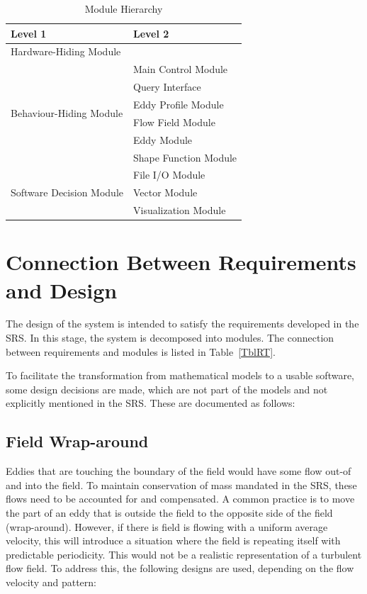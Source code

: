 \documentclass[12pt, titlepage]{article}
\begin{document}
\begin{table}[h!]
\centering
\begin{tabular}{p{} p{}}
\toprule
\textbf{Level 1} & \textbf{Level 2}\\
\midrule

{Hardware-Hiding Module} & ~ \\
\midrule

\multirow{6}{0.3\textwidth}{Behaviour-Hiding Module}
& Main Control Module\\
& Query Interface\\
& Eddy Profile Module\\
& Flow Field Module\\
& Eddy Module\\
& Shape Function Module\\
\midrule

\multirow{3}{0.3\textwidth}{Software Decision Module} 
& File I/O Module\\
& Vector Module\\
& Visualization Module\\
\bottomrule

\end{tabular}
\caption{Module Hierarchy}
\label{TblMH}
\end{table}

\section{Connection Between Requirements and Design} \label{SecConnection}

The design of the system is intended to satisfy the requirements developed in
the SRS. In this stage, the system is decomposed into modules. The connection
between requirements and modules is listed in Table~\ref{TblRT}.

To facilitate the transformation from mathematical models to a usable software, some design decisions are made, which are not part of the models and not explicitly mentioned in the SRS. These are documented as follows:

\subsection{Field Wrap-around}
Eddies that are touching the boundary of the field would have some flow out-of and into the field. To maintain conservation of mass mandated in the SRS, these flows need to be accounted for and compensated. A common practice is to move the part of an eddy that is outside the field to the opposite side of the field (wrap-around). However, if there is field is flowing with a uniform average velocity, this will introduce a situation where the field is repeating itself with predictable periodicity. This would not be a realistic representation of a turbulent flow field. To address this, the following designs are used, depending on the flow velocity and pattern:
\end{document}
